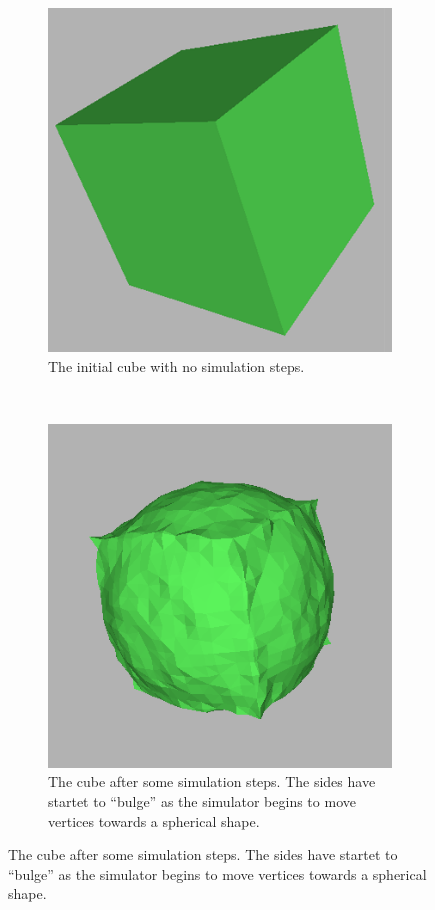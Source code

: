 \begin{figure}
        \centering
        \begin{subfigure}[t]{0.4\textwidth}
                \includegraphics[width=\textwidth]{img/gl0.png}
                \caption{The initial cube with no simulation steps.}
                \label{fig:gl0}
        \end{subfigure}%
        ~ %
        \begin{subfigure}[t]{0.4\textwidth}
                \includegraphics[width=\textwidth]{img/gl1.png}
                \caption{The cube after some simulation steps. The sides have
                         startet to ``bulge'' as the simulator begins to move
                         vertices towards a spherical shape.}
                \label{fig:gl1}
        \end{subfigure}


\end{figure}
